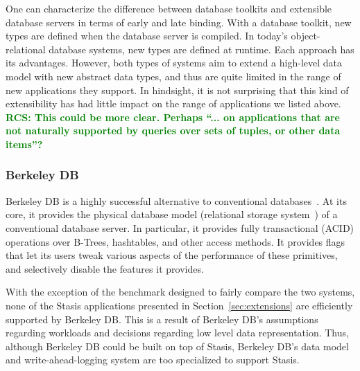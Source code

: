 \documentclass[letterpaper,twocolumn,10pt]{article}
\newcommand{\yad}{Stasis\xspace}
\newcommand{\rcs}[1]{\textcolor{green}{\bf RCS: #1}}
\begin{document}
One can characterize the difference between database toolkits and
extensible database servers in terms of early and late binding.  With
a database toolkit, new types are defined when the database server is
compiled.  In today's object-relational database systems, new types
are defined at runtime.  Each approach has its advantages.  However,
both types of systems aim to extend a high-level data model with new 
abstract data types, and thus are quite limited in the range of new 
applications they support.  In hindsight, it is not surprising that this kind of 
extensibility has had little impact on the range of applications 
we listed above. \rcs{This could be more clear.  Perhaps ``... on applications that are not naturally supported by queries over sets of tuples, or other data items''?}

\subsubsection{Berkeley DB}


Berkeley DB is a highly successful alternative to conventional
databases~\cite{libtp}.  At its core, it provides the physical database model
(relational storage system~\cite{systemR}) of a conventional database server.
In particular, 
it provides fully transactional (ACID) operations over B-Trees, 
hashtables, and other access methods.  It provides flags that 
let its users tweak various aspects of the performance of these
primitives, and selectively disable the features it provides.

With the
exception of the benchmark designed to fairly compare the two systems, none of the \yad 
applications presented in Section~\ref{sec:extensions} are efficiently
supported by Berkeley DB.   This is a result of Berkeley DB's  
assumptions regarding workloads and decisions regarding low level data
representation.  Thus, although Berkeley DB could be built on top of \yad,
Berkeley DB's data model and write-ahead-logging system are too specialized to support \yad.
\end{document}
